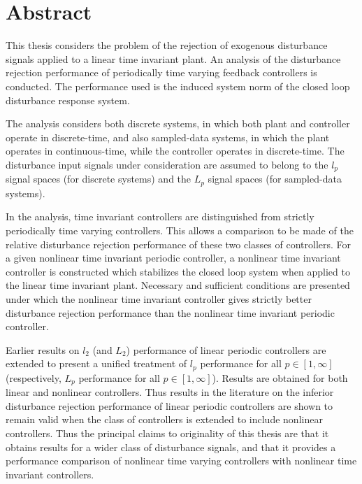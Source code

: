 
\chapter*{Abstract}

This  thesis considers the  problem of the rejection of
exogenous  disturbance   signals  applied to a linear time  invariant  plant.
An   analysis of the disturbance  rejection  performance of
periodically  time varying feedback controllers is  conducted. The performance  used
is the  induced system norm of the  closed loop  disturbance response  system.


The analysis  considers   both  discrete  systems, in  which both
plant and controller  operate in  discrete-time,   and also
sampled-data  systems,  in which the  plant operates in
continuous-time, while the  controller  operates  in
discrete-time.  The disturbance  input  signals  under consideration are  assumed to
belong to the  $l_p$ signal spaces (for discrete  systems) and   the  $L_p$ signal spaces
(for sampled-data  systems).

In the  analysis, time  invariant  controllers are distinguished from strictly
periodically  time varying controllers. This allows a  comparison to be made   of the
relative  disturbance rejection  performance of these two  classes  of controllers.
 For a given nonlinear  time invariant periodic controller, a nonlinear time invariant
controller is constructed which  stabilizes the closed loop system
when applied to the linear time  invariant plant. Necessary and
sufficient conditions are presented under which the nonlinear
time invariant controller gives strictly better  disturbance rejection performance
than the nonlinear  time invariant periodic controller.


Earlier results on $l_2$ (and  $L_2$) performance  of linear periodic  controllers
are extended  to  present a unified treatment of $l_p$ performance for all $p \in
[1,\infty]$ (respectively, $L_p$ performance for all $p \in[1,\infty]$).
  Results  are  obtained  for both linear and nonlinear controllers.  Thus results in
the  literature  on the inferior disturbance rejection performance  of linear
periodic  controllers are shown to remain valid   when the class of  controllers  is
extended to include nonlinear controllers.  Thus the principal claims  to originality
of this thesis are that  it obtains results  for   a wider  class  of disturbance
signals, and  that it provides a performance comparison of nonlinear time varying
controllers with nonlinear time invariant controllers.

